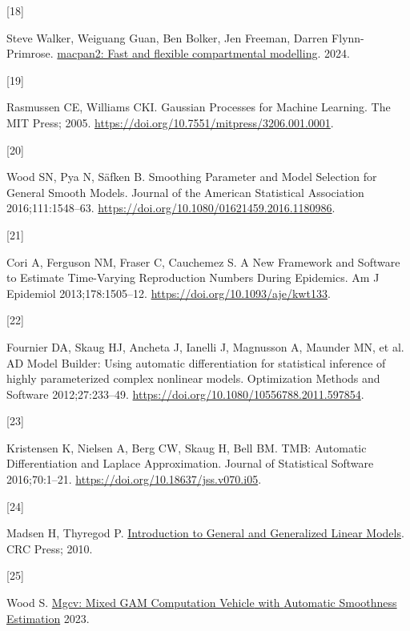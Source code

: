 \documentclass[
11pt, %
oneside, %
english, %
singlespacing, %
]{macthesis} %
\newlength{\cslhangindent}
\newlength{\csllabelwidth}
\newenvironment{CSLReferences}[2] %
{\begin{list}{}{%
	\setlength{\itemindent}{0pt}
	\setlength{\leftmargin}{0pt}
	\setlength{\parsep}{0pt}
	\ifodd #1
	\setlength{\leftmargin}{\cslhangindent}
	\setlength{\itemindent}{-1\cslhangindent}
	\fi
	\setlength{\itemsep}{#2\baselineskip}}}
{\end{list}}
\newcommand{\CSLLeftMargin}[1]{\parbox[t]{\csllabelwidth}{\strut#1\strut}}
\newcommand{\CSLRightInline}[1]{\parbox[t]{\linewidth - \csllabelwidth}{\strut#1\strut}}
\begin{document}
\begin{CSLReferences}{0}{0}
\CSLLeftMargin{{[}18{]} }%
\CSLRightInline{Steve Walker, Weiguang Guan, Ben Bolker, Jen Freeman, Darren Flynn-Primrose. \href{https://canmod.github.io/macpan2/}{macpan2: Fast and flexible compartmental modelling}. 2024.}

\CSLLeftMargin{{[}19{]} }%
\CSLRightInline{Rasmussen CE, Williams CKI. Gaussian {Processes} for {Machine Learning}. The MIT Press; 2005. \url{https://doi.org/10.7551/mitpress/3206.001.0001}.}

\CSLLeftMargin{{[}20{]} }%
\CSLRightInline{Wood SN, Pya N, Säfken B. Smoothing {Parameter} and {Model Selection} for {General Smooth Models}. Journal of the American Statistical Association 2016;111:1548--63. \url{https://doi.org/10.1080/01621459.2016.1180986}.}

\CSLLeftMargin{{[}21{]} }%
\CSLRightInline{Cori A, Ferguson NM, Fraser C, Cauchemez S. A {New Framework} and {Software} to {Estimate Time-Varying Reproduction Numbers During Epidemics}. Am J Epidemiol 2013;178:1505--12. \url{https://doi.org/10.1093/aje/kwt133}.}

\CSLLeftMargin{{[}22{]} }%
\CSLRightInline{Fournier DA, Skaug HJ, Ancheta J, Ianelli J, Magnusson A, Maunder MN, et al. {AD Model Builder}: Using automatic differentiation for statistical inference of highly parameterized complex nonlinear models. Optimization Methods and Software 2012;27:233--49. \url{https://doi.org/10.1080/10556788.2011.597854}.}

\CSLLeftMargin{{[}23{]} }%
\CSLRightInline{Kristensen K, Nielsen A, Berg CW, Skaug H, Bell BM. {TMB}: {Automatic Differentiation} and {Laplace Approximation}. Journal of Statistical Software 2016;70:1--21. \url{https://doi.org/10.18637/jss.v070.i05}.}

\CSLLeftMargin{{[}24{]} }%
\CSLRightInline{Madsen H, Thyregod P. \href{http://gen.lib.rus.ec/book/index.php?md5=d9ba089c485d875f0dbfdfb40d7f990a}{Introduction to {General} and {Generalized Linear Models}}. CRC Press; 2010.}

\CSLLeftMargin{{[}25{]} }%
\CSLRightInline{Wood S. \href{https://cran.r-project.org/web/packages/mgcv/index.html}{Mgcv: {Mixed GAM Computation Vehicle} with {Automatic Smoothness Estimation}} 2023.}


\end{CSLReferences}
\end{document}
